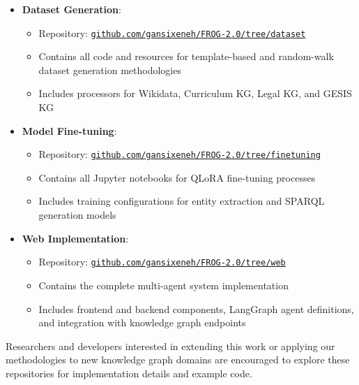 \begin{itemize}
    \item \textbf{Dataset Generation}: 
    \begin{itemize}
        \item Repository: \href{https://github.com/gansixeneh/FROG-2.0/tree/dataset}{\texttt{github.com/gansixeneh/FROG-2.0/tree/dataset}}
        \item Contains all code and resources for template-based and random-walk dataset generation methodologies
        \item Includes processors for Wikidata, Curriculum KG, Legal KG, and GESIS KG
    \end{itemize}
    
    \item \textbf{Model Fine-tuning}: 
    \begin{itemize}
        \item Repository: \href{https://github.com/gansixeneh/FROG-2.0/tree/finetuning}{\texttt{github.com/gansixeneh/FROG-2.0/tree/finetuning}}
        \item Contains all Jupyter notebooks for QLoRA fine-tuning processes
        \item Includes training configurations for entity extraction and SPARQL generation models
    \end{itemize}
    
    \item \textbf{Web Implementation}: 
    \begin{itemize}
        \item Repository: \href{https://github.com/gansixeneh/FROG-2.0/tree/web}{\texttt{github.com/gansixeneh/FROG-2.0/tree/web}}
        \item Contains the complete multi-agent system implementation
        \item Includes frontend and backend components, LangGraph agent definitions, and integration with knowledge graph endpoints
    \end{itemize}
\end{itemize}

Researchers and developers interested in extending this work or applying our methodologies to new knowledge graph domains are encouraged to explore these repositories for implementation details and example code.